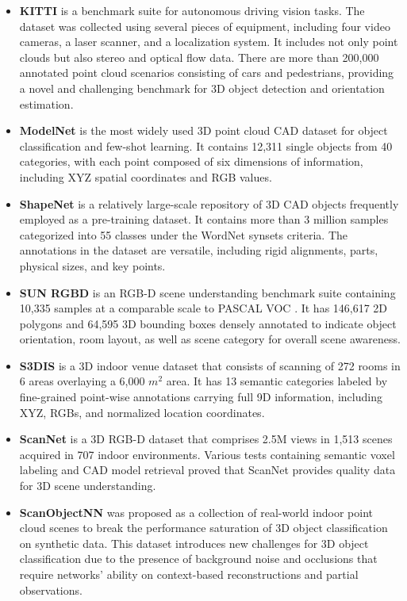 \documentclass[a4paper,fleqn]{cas-dc}
\begin{document}
\begin{itemize}
    \item \textbf{KITTI} \citep{geiger2012we} is a benchmark suite for autonomous driving vision tasks. The dataset was collected using several pieces of equipment, including four video cameras, a laser scanner, and a localization system. It includes not only point clouds but also stereo and optical flow data. There are more than 200,000 annotated point cloud scenarios consisting of cars and pedestrians, providing a novel and challenging benchmark for 3D object detection and orientation estimation.
    \item \textbf{ModelNet} \citep{wu20153d} is the most widely used 3D point cloud CAD dataset for object classification and few-shot learning. It contains 12,311 single objects from 40 categories, with each point composed of six dimensions of information, including XYZ spatial coordinates and RGB values.
    \item \textbf{ShapeNet} \citep{chang2015shapenet} is a relatively large-scale repository of 3D CAD objects frequently employed as a pre-training dataset. It contains more than 3 million samples categorized into 55 classes under the WordNet synsets \citep{miller1995wordnet} criteria. The annotations in the dataset are versatile, including rigid alignments, parts, physical sizes, and key points.
    \item \textbf{SUN RGBD} \citep{song2015sun} is an RGB-D scene understanding benchmark suite containing 10,335 samples at a comparable scale to PASCAL VOC \citep{pascal-voc-2012}. It has 146,617 2D polygons and 64,595 3D bounding boxes densely annotated to indicate object orientation, room layout, as well as scene category for overall scene awareness.
    \item \textbf{S3DIS} \citep{armeni20163d} is a 3D indoor venue dataset that consists of scanning of 272 rooms in 6 areas overlaying a 6,000 $m^2$ area. It has 13 semantic categories labeled by fine-grained point-wise annotations carrying full 9D information, including XYZ, RGBs, and normalized location coordinates.
    \item \textbf{ScanNet} \citep{dai2017scannet} is a 3D RGB-D dataset that comprises 2.5M views in 1,513 scenes acquired in 707 indoor environments. Various tests containing semantic voxel labeling and CAD model retrieval proved that ScanNet provides quality data for 3D scene understanding.
    \item \textbf{ScanObjectNN} \citep{uy2019revisiting} was proposed as a collection of real-world indoor point cloud scenes to break the performance saturation of 3D object classification on synthetic data. This dataset introduces new challenges for 3D object classification due to the presence of background noise and occlusions that require networks' ability on context-based reconstructions and partial observations.

\end{itemize}
\end{document}
